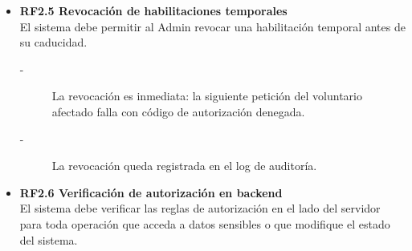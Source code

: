 \begin{itemize}
    \item \textbf{RF2.5 Revocación de habilitaciones temporales} \\
    El sistema debe permitir al Admin revocar una habilitación temporal antes
    de su caducidad.
    \begin{description}
        \item[-] La revocación es inmediata: la siguiente petición del voluntario
        afectado falla con código de autorización denegada.
        \item[-] La revocación queda registrada en el log de auditoría.
    \end{description}
    
    \item \textbf{RF2.6 Verificación de autorización en backend} \\
    El sistema debe verificar las reglas de autorización en el lado del
    servidor para toda operación que acceda a datos sensibles o que
    modifique el estado del sistema.
\end{itemize}





